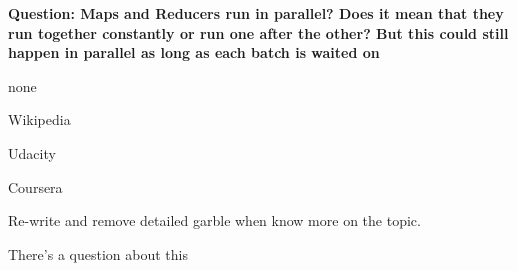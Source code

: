 \documentclass[11pt]{article}
\newcommand{\question}[2] {
  \textbf{Question: #1}
  \begin{center} #2
\end{center}
}
\begin{document}
\question{Maps and Reducers run in parallel? Does it mean that they run together constantly or run one after the other? But this could still happen in parallel as long as each batch is waited on}{none}

\begin{thebibliography}{9}

Wikipedia

Udacity

Coursera

Re-write and remove detailed garble when know more on the topic.

There's a question about this

\end{thebibliography}
\end{document}
